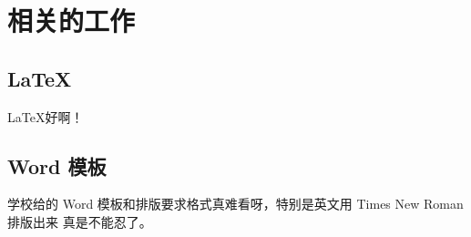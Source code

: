 \chapter{相关的工作}

\section{\LaTeX}
\LaTeX 好啊！

\section{Word 模板}
学校给的 Word 模板和排版要求格式真难看呀，特别是英文用 Times New Roman 排版出来
真是不能忍了。

